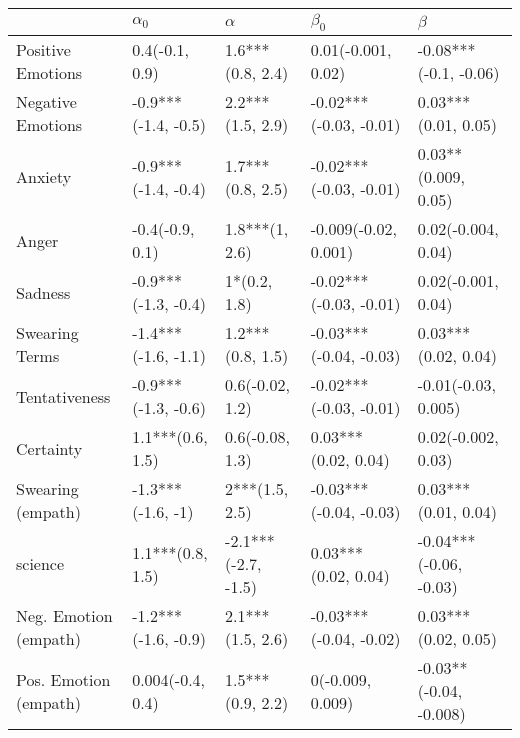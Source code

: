 \begin{tabular}{lllll}
\toprule
{} &           $\alpha_0$ &             $\alpha$ &               $\beta_0$ &                 $\beta$ \\
\midrule
Positive Emotions     &       0.4(-0.1, 0.9) &     1.6***(0.8, 2.4) &      0.01(-0.001, 0.02) &   -0.08***(-0.1, -0.06) \\
Negative Emotions     &  -0.9***(-1.4, -0.5) &     2.2***(1.5, 2.9) &  -0.02***(-0.03, -0.01) &     0.03***(0.01, 0.05) \\
Anxiety               &  -0.9***(-1.4, -0.4) &     1.7***(0.8, 2.5) &  -0.02***(-0.03, -0.01) &     0.03**(0.009, 0.05) \\
Anger                 &      -0.4(-0.9, 0.1) &       1.8***(1, 2.6) &    -0.009(-0.02, 0.001) &      0.02(-0.004, 0.04) \\
Sadness               &  -0.9***(-1.3, -0.4) &         1*(0.2, 1.8) &  -0.02***(-0.03, -0.01) &      0.02(-0.001, 0.04) \\
Swearing Terms        &  -1.4***(-1.6, -1.1) &     1.2***(0.8, 1.5) &  -0.03***(-0.04, -0.03) &     0.03***(0.02, 0.04) \\
Tentativeness         &  -0.9***(-1.3, -0.6) &      0.6(-0.02, 1.2) &  -0.02***(-0.03, -0.01) &     -0.01(-0.03, 0.005) \\
Certainty             &     1.1***(0.6, 1.5) &      0.6(-0.08, 1.3) &     0.03***(0.02, 0.04) &      0.02(-0.002, 0.03) \\
Swearing (empath)     &    -1.3***(-1.6, -1) &       2***(1.5, 2.5) &  -0.03***(-0.04, -0.03) &     0.03***(0.01, 0.04) \\
science               &     1.1***(0.8, 1.5) &  -2.1***(-2.7, -1.5) &     0.03***(0.02, 0.04) &  -0.04***(-0.06, -0.03) \\
Neg. Emotion (empath) &  -1.2***(-1.6, -0.9) &     2.1***(1.5, 2.6) &  -0.03***(-0.04, -0.02) &     0.03***(0.02, 0.05) \\
Pos. Emotion (empath) &     0.004(-0.4, 0.4) &     1.5***(0.9, 2.2) &        0(-0.009, 0.009) &  -0.03**(-0.04, -0.008) \\
\bottomrule
\end{tabular}
